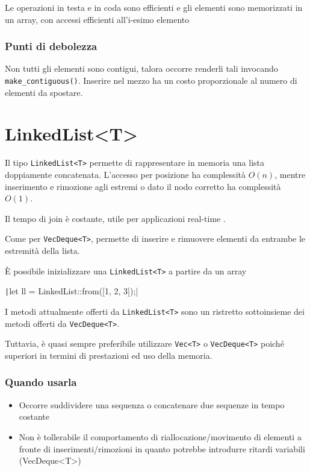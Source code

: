 Le operazioni in testa e in coda sono efficienti e gli elementi sono memorizzati
in un array, con accessi efficienti all'i-esimo elemento


\subsubsection{Punti di debolezza}

Non tutti gli elementi sono contigui, talora occorre renderli tali invocando
\verb|make_contiguous()|. Inserire nel mezzo ha un costo proporzionale al numero
di elementi da spostare.


\section{LinkedList<T>}

Il tipo \texttt{LinkedList<T>} permette di rappresentare in memoria una lista
doppiamente concatenata.
L'accesso per posizione ha complessità $O(n)$, mentre inserimento e rimozione agli
estremi o dato il nodo corretto ha complessità $O(1)$.

Il tempo di join è costante, utile per applicazioni real-time .

Come per \texttt{VecDeque<T>}, permette di inserire e rimuovere elementi da
entrambe le estremità della lista.

È possibile inizializzare una \texttt{LinkedList<T>} a partire da un array


\texttt|let ll = LinkedList::from([1, 2, 3]);|

I metodi attualmente offerti da \texttt{LinkedList<T>} sono un ristretto
sottoinsieme dei metodi offerti da \texttt{VecDeque<T>}.

Tuttavia, è quasi sempre preferibile utilizzare \texttt{Vec<T>}  o \texttt{VecDeque<T>}
poiché superiori in termini di prestazioni ed uso della memoria.

\subsubsection{Quando usarla}

\begin{itemize}
  \item Occorre suddividere una sequenza o concatenare due sequenze in tempo
        costante
  \item Non è tollerabile il comportamento di riallocazione/movimento di
        elementi a fronte di inserimenti/rimozioni in quanto potrebbe introdurre
        ritardi variabili (VecDeque<T>)
\end{itemize}

